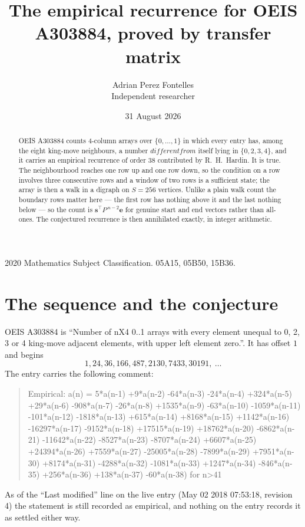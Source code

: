 \documentclass[11pt,a4paper]{article}
\title{The empirical recurrence for OEIS A303884, proved by transfer matrix}
\author{Adrian Perez Fontelles\\ \small Independent researcher}
\date{31 August 2026}
\theoremstyle{plain}
\theoremstyle{definition}
\begin{document}
\maketitle

\begin{abstract}
OEIS A303884 counts $4$-column arrays over $\{0,\dots,1\}$ in which every entry has,
among the eight king-move neighbours, a number $different from$ itself lying in $\{0,2,3,4\}$, and it carries an empirical
recurrence of order $38$ contributed by R.~H.~Hardin. It is true. The neighbourhood
reaches one row up and one row down, so the condition on a row involves three consecutive
rows and a window of two rows is a sufficient state; the array is then a walk in a digraph
on $S=256$ vertices. Unlike a plain walk count the boundary rows matter here --- the first
row has nothing above it and the last nothing below --- so the count is
$\mathbf{s}^{\!\top}P^{\,n-2}\mathbf{e}$ for genuine start and end vectors rather than
all-ones. The conjectured recurrence is then annihilated exactly, in integer arithmetic.
\end{abstract}

\noindent\small 2020 Mathematics Subject Classification. 05A15, 05B50, 15B36.\normalsize

\section{The sequence and the conjecture}

OEIS A303884 is ``Number of nX4 0..1 arrays with every element unequal to 0, 2, 3 or 4 king-move adjacent elements, with upper left element zero.''. It has offset
$1$ and begins
\[
1, 24, 36, 166, 487, 2130, 7433, 30191,\ \dots
\]
The entry carries the following comment:
\begin{quote}\small
Empirical: a(n) = 5*a(n-1) +9*a(n-2) -64*a(n-3) -24*a(n-4) +324*a(n-5) +29*a(n-6) -908*a(n-7) -26*a(n-8) +1535*a(n-9) -63*a(n-10) -1059*a(n-11) -101*a(n-12) -1818*a(n-13) +615*a(n-14) +8168*a(n-15) +1142*a(n-16) -16297*a(n-17) -9152*a(n-18) +17515*a(n-19) +18762*a(n-20) -6862*a(n-21) -11642*a(n-22) -8527*a(n-23) -8707*a(n-24) +6607*a(n-25) +24394*a(n-26) +7559*a(n-27) -25005*a(n-28) -7899*a(n-29) +7951*a(n-30) +8174*a(n-31) -4288*a(n-32) -1081*a(n-33) +1247*a(n-34) -846*a(n-35) +256*a(n-36) +138*a(n-37) -60*a(n-38) for n>41
\end{quote}
As of the ``Last modified'' line on the live entry (May 02 2018 07:53:18, revision
4) the statement is still recorded as empirical, and nothing on the entry
records it as settled either way.
\end{document}
